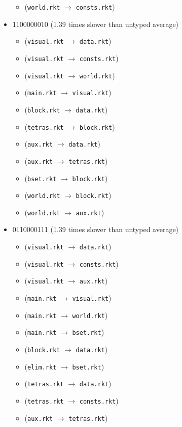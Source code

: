 \documentclass{article}
\newcommand{\mono}[1]{\texttt{#1}}
\begin{document}
\begin{itemize}
\begin{itemize}
  \item (\mono{world.rkt} $\rightarrow$ \mono{consts.rkt})
  \end{itemize}
\item 1100000010 (1.39 times slower than untyped average)
  \begin{itemize}
  \item (\mono{visual.rkt} $\rightarrow$ \mono{data.rkt})
  \item (\mono{visual.rkt} $\rightarrow$ \mono{consts.rkt})
  \item (\mono{visual.rkt} $\rightarrow$ \mono{world.rkt})
  \item (\mono{main.rkt} $\rightarrow$ \mono{visual.rkt})
  \item (\mono{block.rkt} $\rightarrow$ \mono{data.rkt})
  \item (\mono{tetras.rkt} $\rightarrow$ \mono{block.rkt})
  \item (\mono{aux.rkt} $\rightarrow$ \mono{data.rkt})
  \item (\mono{aux.rkt} $\rightarrow$ \mono{tetras.rkt})
  \item (\mono{bset.rkt} $\rightarrow$ \mono{block.rkt})
  \item (\mono{world.rkt} $\rightarrow$ \mono{block.rkt})
  \item (\mono{world.rkt} $\rightarrow$ \mono{aux.rkt})
  \end{itemize}
\item 0110000111 (1.39 times slower than untyped average)
  \begin{itemize}
  \item (\mono{visual.rkt} $\rightarrow$ \mono{data.rkt})
  \item (\mono{visual.rkt} $\rightarrow$ \mono{consts.rkt})
  \item (\mono{visual.rkt} $\rightarrow$ \mono{aux.rkt})
  \item (\mono{main.rkt} $\rightarrow$ \mono{visual.rkt})
  \item (\mono{main.rkt} $\rightarrow$ \mono{world.rkt})
  \item (\mono{main.rkt} $\rightarrow$ \mono{bset.rkt})
  \item (\mono{block.rkt} $\rightarrow$ \mono{data.rkt})
  \item (\mono{elim.rkt} $\rightarrow$ \mono{bset.rkt})
  \item (\mono{tetras.rkt} $\rightarrow$ \mono{data.rkt})
  \item (\mono{tetras.rkt} $\rightarrow$ \mono{consts.rkt})
  \item (\mono{aux.rkt} $\rightarrow$ \mono{tetras.rkt})

\end{itemize}
\end{itemize}
\end{document}
